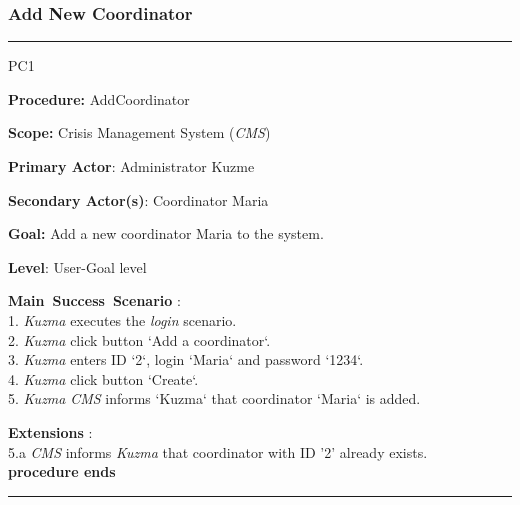 \subsubsection{Add New Coordinator}
\vspace{0.5cm}
\hrule
\begin{lyxlist}{PC1}
\small{
\item [\textbf{Procedure:}] AddCoordinator
\item [\textbf{Scope:}] Crisis Management System (\emph{CMS})
\item [\textbf{Primary Actor}:] Administrator Kuzme
\item [\textbf{Secondary Actor(s)}:] Coordinator Maria
\item [\textbf{Goal:}] Add a new coordinator Maria to the system.
\item [\textbf{Level}:] User-Goal level
\item [\textbf{Main~Success~Scenario}]:\\
1. \emph{Kuzma} executes the \emph{login} scenario.\\
2. \emph{Kuzma} click button `Add a coordinator`.\\
3. \emph{Kuzma} enters ID `2`, login `Maria` and password `1234`. \\
4. \emph{Kuzma} click button `Create`. \\
5. \emph{Kuzma} \emph{CMS} informs `Kuzma` that coordinator `Maria` is added. 
\item [\textbf{Extensions}]:\\
5.a \emph{CMS} informs \emph{Kuzma} that coordinator with ID '2' already
exists.\\
\hspace*{0.5cm} \textbf{procedure ends}
}
\end{lyxlist}
\hrule
\vspace{0.5cm}

